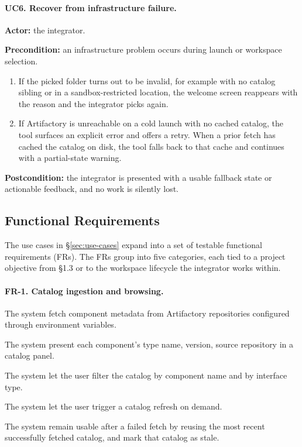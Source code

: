 \paragraph{UC6. Recover from infrastructure failure.}
\textbf{Actor:} the integrator. 

\noindent\textbf{Precondition:} an infrastructure problem occurs during launch or workspace selection.
\begin{enumerate}
    \item If the picked folder turns out to be invalid, for example with no catalog sibling or in a sandbox-restricted location, the welcome screen reappears with the reason and the integrator picks again.
    \item If Artifactory is unreachable on a cold launch with no cached catalog, the tool surfaces an explicit error and offers a retry. When a prior fetch has cached the catalog on disk, the tool falls back to that cache and continues with a partial-state warning.
\end{enumerate}
\noindent\textbf{Postcondition:} the integrator is presented with a usable fallback state or actionable feedback, and no work is silently lost.

\subsection{Functional Requirements}
\label{sec:frs}

The use cases in \S\ref{sec:use-cases} expand into a set of testable functional requirements (FRs). The FRs group into five 
categories, each tied to a project objective from \S1.3 or to the workspace lifecycle the integrator works within.

\pagebreak

\paragraph{FR-1. Catalog ingestion and browsing.}
\begin{reqlist}
    \item[FR-1.1.] The system fetch component metadata from Artifactory repositories configured through environment variables.
    \item[FR-1.2.] The system present each component's type name, version, source repository in a catalog panel.
    \item[FR-1.3.] The system let the user filter the catalog by component name and by interface type.
    \item[FR-1.4.] The system let the user trigger a catalog refresh on demand.
    \item[FR-1.5.] The system remain usable after a failed fetch by reusing the most recent successfully fetched catalog, and mark that catalog as stale.
\end{reqlist}

